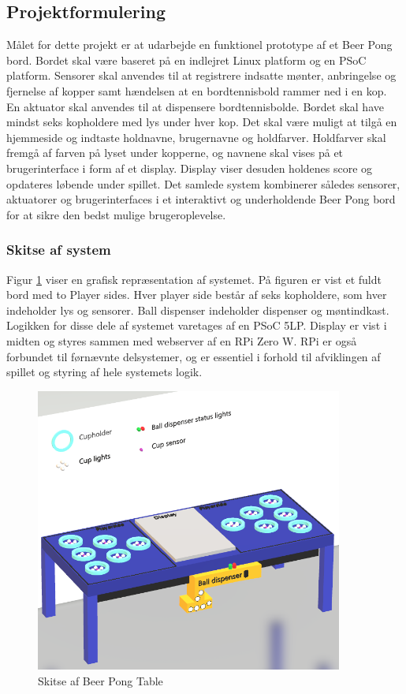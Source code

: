 \documentclass[Rapport/Rapport_main.tex]{subfiles}
\begin{document}
\subsection{Projektformulering}
Målet for dette projekt er at udarbejde en funktionel prototype af et Beer Pong bord. Bordet skal være baseret på en indlejret Linux platform og en PSoC platform. Sensorer skal anvendes til at registrere indsatte mønter, anbringelse og fjernelse af kopper samt hændelsen at en bordtennisbold rammer ned i en kop. En aktuator skal anvendes til at dispensere bordtennisbolde. Bordet skal have mindst seks kopholdere med lys under hver kop. Det skal være muligt at tilgå en hjemmeside og indtaste holdnavne, brugernavne og holdfarver. Holdfarver skal fremgå af farven på lyset under kopperne, og navnene skal vises på et brugerinterface i form af et display. Display viser desuden holdenes score og opdateres løbende under spillet. Det samlede system kombinerer således sensorer, aktuatorer og brugerinterfaces i et interaktivt og underholdende Beer Pong bord for at sikre den bedst mulige brugeroplevelse.

\subsubsection{Skitse af system}
Figur \ref{fig:system_skitse} viser en grafisk repræsentation af systemet. På figuren er vist et fuldt bord med to Player sides. Hver player side består af seks kopholdere, som hver indeholder lys og sensorer. Ball dispenser indeholder dispenser og møntindkast. Logikken for disse dele af systemet varetages af en PSoC 5LP. Display er vist i midten og styres sammen med webserver af en RPi Zero W. RPi er også forbundet til førnævnte delsystemer, og er essentiel i forhold til afviklingen af spillet og styring af hele systemets logik.

\begin{figure}[H]
    \centering
    \includegraphics[width=0.9\textwidth]{Rapport/Indledning/graphics/system_skitse.png}
    \caption{Skitse af Beer Pong Table}
    \label{fig:system_skitse}
\end{figure}
\end{document}
